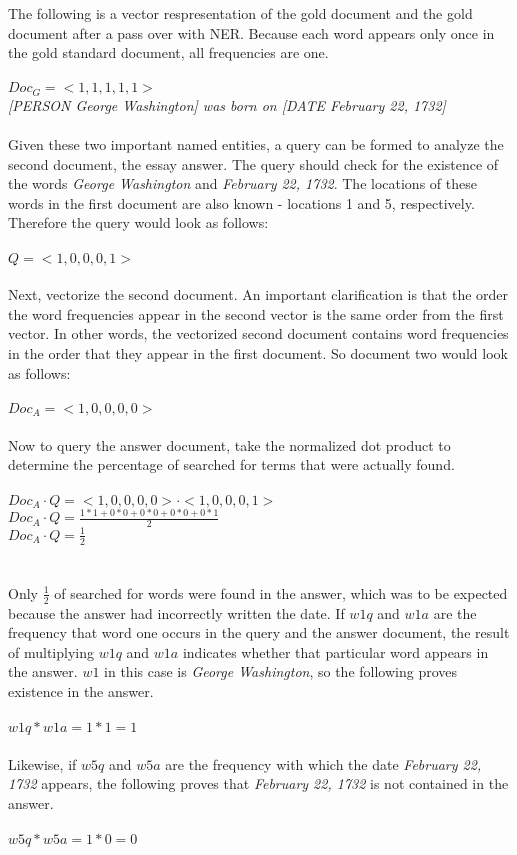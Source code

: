 The following is a vector respresentation of the gold document and the gold document after a pass over with NER. Because each word appears only once in the gold standard document, all frequencies are one.
\\\\
$Doc_G=<1, 1, 1, 1, 1>$\\
\textit{[PERSON George Washington] was born on [DATE February 22, 1732]}
\\\\
Given these two important named entities, a query can be formed to analyze the second document, the essay answer. The query should check for the existence of the words \textit{George Washington} and \textit{February 22, 1732}. The locations of these words in the first document are also known - locations 1 and 5, respectively. Therefore the query would look as follows:
\\\\
$Q=<1, 0, 0 , 0, 1>$
\\\\
Next, vectorize the second document. An important clarification is that the order the word frequencies appear in the second vector is the same order from the first vector. In other words, the vectorized second document contains word frequencies in the order that they appear in the first document. So document two would look as follows:
\\\\
$Doc_A=<1, 0, 0, 0, 0>$
\\\\
Now to query the answer document, take the normalized dot product to determine the percentage of searched for terms that were actually found.
\\\\
$Doc_A \cdot Q = <1, 0, 0, 0, 0> \cdot <1, 0, 0, 0, 1>$\\
$Doc_A \cdot Q = \frac{1*1 + 0*0 + 0*0 + 0*0 + 0*1}{2} $\\
$Doc_A \cdot Q = \frac{1}{2}$\\
\\\\
Only $\frac{1}{2}$ of searched for words were found in the answer, which was to be expected because the answer had incorrectly written the date. If $w1q$ and $w1a$ are the frequency that word one occurs in the query and the answer document, the result of multiplying $w1q$ and $w1a$ indicates whether that particular word appears in the answer. $w1$ in this case is \textit{George Washington}, so the following proves existence in the answer.
\\\\
$w1q * w1a = 1*1 = 1$
\\\\
Likewise, if $w5q$ and $w5a$ are the frequency with which the date \textit{February 22, 1732} appears, the following proves that \textit{February 22, 1732} is not contained in the answer.
\\\\
$w5q * w5a = 1*0 = 0$
\\\

